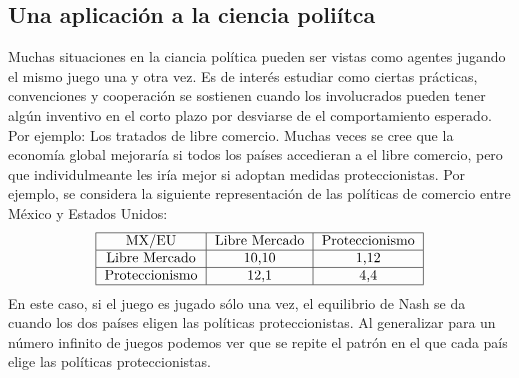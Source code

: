 \documentclass[letterpaper,12pt,oneside]{book}
\begin{document}
\subsection{Una aplicaci\'on a la ciencia poli\'itca}
Muchas situaciones en la ciancia pol\'itica pueden ser vistas como agentes jugando el mismo juego una y otra vez. Es de inter\'es estudiar como ciertas pr\'acticas, convenciones y cooperaci\'on se sostienen cuando los involucrados pueden tener alg\'un inventivo en el corto plazo por desviarse de el comportamiento esperado. Por ejemplo: Los tratados de libre comercio. Muchas veces se cree que la econom\'ia global mejorar\'ia si todos los pa\'ises accedieran a el libre comercio, pero que individulmeante les ir\'ia mejor si adoptan medidas proteccionistas. Por ejemplo, se considera la siguiente representaci\'on de las pol\'iticas de comercio entre M\'exico y Estados Unidos:
%
\begin{eqnarray}
    \begin{tabular}{ |c|c|c| } 
     \hline
     MX/EU & Libre Mercado & Proteccionismo \\ 
     \hline
     Libre Mercado & 10,10 & 1,12 \\ 
     \hline
     Proteccionismo & 12,1 & 4,4 \\ 
     \hline
    \end{tabular} 
\end{eqnarray}
%
En este caso, si el juego es jugado s\'olo una vez, el equilibrio de Nash se da cuando los dos pa\'ises eligen las pol\'iticas proteccionistas. Al generalizar para un n\'umero infinito de juegos podemos ver que se repite el patr\'on en el que cada pa\'is elige las pol\'iticas proteccionistas.
\end{document}
